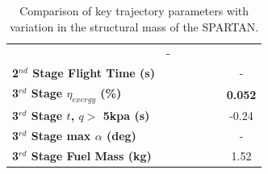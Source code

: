 \begin{table}[ht]
\begin{tabular}{l c c c c c c}
	& -
	\\
	\textbf{2$^{nd}$ Stage Flight Time (s)}
	& \secondFlightTimemSPARTANNinetyFiveNoReturn
	& \secondFlightTimemSPARTANNinetySevenFiveNoReturn
	& \secondFlightTimemSPARTANStandardNoReturn
	& \secondFlightTimemSPARTANOneHundredTwoFiveNoReturn
	& \secondFlightTimemSPARTANOneHundredFiveNoReturn
	& -
	\\
	\hline 
	\textbf{3$^{rd}$ Stage $\eta_{exergy}$ (\%)}
	& \textbf{\thirddExergyEffmSPARTANNinetyFiveNoReturn}
	& \textbf{\thirddExergyEffmSPARTANNinetySevenFiveNoReturn}
	& \textbf{\thirddExergyEffmSPARTANStandardNoReturn}
	& \textbf{\thirddExergyEffmSPARTANOneHundredTwoFiveNoReturn}
	& \textbf{\thirddExergyEffmSPARTANOneHundredFiveNoReturn}
	& \textbf{0.052}
	\\
	\textbf{3$^{rd}$ Stage $t$, $q >$ 5kpa (s)}
	& \thirdqOverFivemSPARTANNinetyFiveNoReturn
	& \thirdqOverFivemSPARTANNinetySevenFiveNoReturn
	& \thirdqOverFivemSPARTANStandardNoReturn
	& \thirdqOverFivemSPARTANOneHundredTwoFiveNoReturn
	& \thirdqOverFivemSPARTANOneHundredFiveNoReturn
	&-0.24
	\\
	\textbf{3$^{rd}$ Stage max $\alpha$ (deg)}
	& \thirdmaxAoAmSPARTANNinetyFiveNoReturn
	& \thirdmaxAoAmSPARTANNinetySevenFiveNoReturn
	& \thirdmaxAoAmSPARTANStandardNoReturn
	& \thirdmaxAoAmSPARTANOneHundredTwoFiveNoReturn
	& \thirdmaxAoAmSPARTANOneHundredFiveNoReturn
	& -
	\\
	\textbf{3$^{rd}$ Stage Fuel Mass (kg)}
	& \thirdmFuelmSPARTANNinetyFiveNoReturn
	& \thirdmFuelmSPARTANNinetySevenFiveNoReturn
	& \thirdmFuelmSPARTANStandardNoReturn
	& \thirdmFuelmSPARTANOneHundredTwoFiveNoReturn
	& \thirdmFuelmSPARTANOneHundredFiveNoReturn
	&1.52
	\\
	\hline 
\end{tabular}
\caption{Comparison of key trajectory parameters with variation in the structural mass of the SPARTAN.}
\label{tab:comparison100}
	
\end{table}


